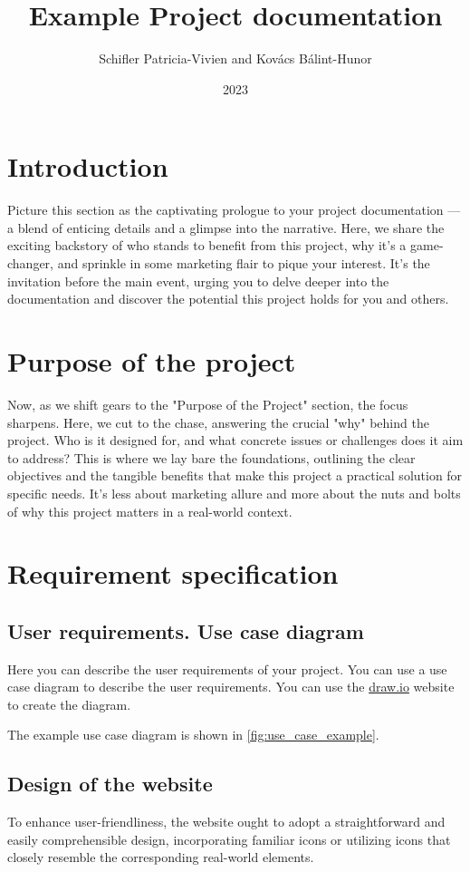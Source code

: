 \documentclass[12pt,a4paper]{article}
\title{Example Project documentation}
\author{Schifler Patricia-Vivien and Kovács Bálint-Hunor}
\date{2023}
\begin{document}


\newpage
\tableofcontents
\newpage
\begin{spacing}{1.5}
    \section{Introduction}\label{sec:intro}

    Picture this section as the captivating prologue to your project documentation
    --- a blend of enticing details and a glimpse into the narrative. Here, we
    share the exciting backstory of who stands to benefit from this project, why
    it's a game-changer, and sprinkle in some marketing flair to pique your
    interest. It's the invitation before the main event, urging you to delve deeper
    into the documentation and discover the potential this project holds for you
    and others.

    \section{Purpose of the project}\label{sec:purpose}

    Now, as we shift gears to the "Purpose of the Project" section, the focus
    sharpens. Here, we cut to the chase, answering the crucial "why" behind the
    project. Who is it designed for, and what concrete issues or challenges does it
    aim to address? This is where we lay bare the foundations, outlining the clear
    objectives and the tangible benefits that make this project a practical
    solution for specific needs. It's less about marketing allure and more about
    the nuts and bolts of why this project matters in a real-world context.

    \section{Requirement specification}\label{sec:req_spec}
    \subsection{User requirements. Use case diagram}\label{subsec: user_req}
    Here you can describe the user requirements of your project. You can use a use
    case diagram to describe the user requirements. You can use the
    \href{https://www.draw.io/}{draw.io} website to create the diagram.

    The example use case diagram is shown in \autoref{fig:use_case_example}.
    \subsection{Design of the website}
    To enhance user-friendliness, the website ought to adopt a straightforward and
    easily comprehensible design, incorporating familiar icons or utilizing icons
    that closely resemble the corresponding real-world elements.

\end{spacing}
\end{document}
